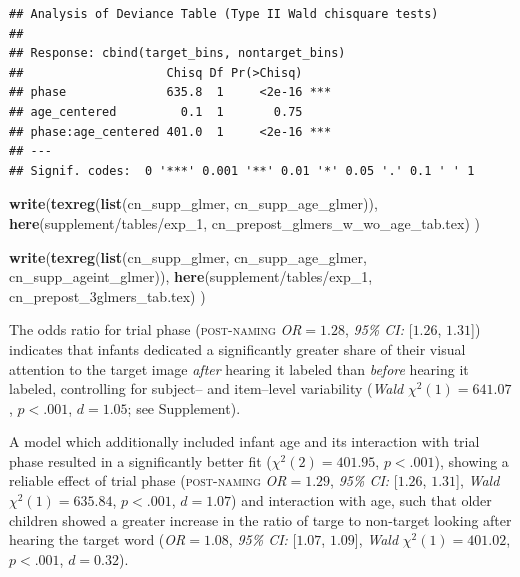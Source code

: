 \documentclass[
  doc,floatsintext]{apa6}
\newenvironment{Shaded}{\begin{snugshade}}{\end{snugshade}}
\newcommand{\FunctionTok}[1]{\textcolor[rgb]{0.13,0.29,0.53}{\textbf{#1}}}
\newcommand{\NormalTok}[1]{#1}
\newcommand{\StringTok}[1]{\textcolor[rgb]{0.31,0.60,0.02}{#1}}
\begin{document}
\begin{verbatim}
## Analysis of Deviance Table (Type II Wald chisquare tests)
## 
## Response: cbind(target_bins, nontarget_bins)
##                    Chisq Df Pr(>Chisq)    
## phase              635.8  1     <2e-16 ***
## age_centered         0.1  1       0.75    
## phase:age_centered 401.0  1     <2e-16 ***
## ---
## Signif. codes:  0 '***' 0.001 '**' 0.01 '*' 0.05 '.' 0.1 ' ' 1
\end{verbatim}

\begin{Shaded}
\begin{Highlighting}[]
\FunctionTok{write}\NormalTok{(}\FunctionTok{texreg}\NormalTok{(}\FunctionTok{list}\NormalTok{(cn\_supp\_glmer, cn\_supp\_age\_glmer)), }
      \FunctionTok{here}\NormalTok{(}\StringTok{\textquotesingle{}supplement/tables/exp\_1\textquotesingle{}}\NormalTok{, }\StringTok{\textquotesingle{}cn\_prepost\_glmers\_w\_wo\_age\_tab.tex\textquotesingle{}}\NormalTok{)}
\NormalTok{      )}

\FunctionTok{write}\NormalTok{(}\FunctionTok{texreg}\NormalTok{(}\FunctionTok{list}\NormalTok{(cn\_supp\_glmer, cn\_supp\_age\_glmer, cn\_supp\_ageint\_glmer)),}
      \FunctionTok{here}\NormalTok{(}\StringTok{\textquotesingle{}supplement/tables/exp\_1\textquotesingle{}}\NormalTok{, }\StringTok{\textquotesingle{}cn\_prepost\_3glmers\_tab.tex\textquotesingle{}}\NormalTok{)}
\NormalTok{      )}
\end{Highlighting}
\end{Shaded}

The odds ratio for trial phase (\textsc{post-naming} \textit{OR}\(=1.28\), \textit{95\% CI:} {[}\(1.26\), \(1.31\){]}) indicates that infants dedicated a significantly greater share of their visual attention to the target image \textit{after} hearing it labeled than \textit{before} hearing it labeled, controlling for subject-- and item--level variability (\textit{Wald} \(\chi^2(1)=641.07\), \(p<.001\), \(d=1.05\); see Supplement).

A model which additionally included infant age and its interaction with trial phase resulted in a significantly better fit (\(\chi^2(2)=401.95\), \(p<.001\)), showing a reliable effect of trial phase (\textsc{post-naming} \textit{OR}\(=1.29\), \textit{95\% CI:} {[}\(1.26\), \(1.31\){]}, \textit{Wald} \(\chi^2(1)=635.84\), \(p<.001\), \(d=1.07\)) and interaction with age, such that older children showed a greater increase in the ratio of targe to non-target looking after hearing the target word (\textit{OR}\(=1.08\), \textit{95\% CI:} {[}\(1.07\), \(1.09\){]}, \textit{Wald} \(\chi^2(1)=401.02\), \(p<.001\), \(d=0.32\)).
\end{document}
